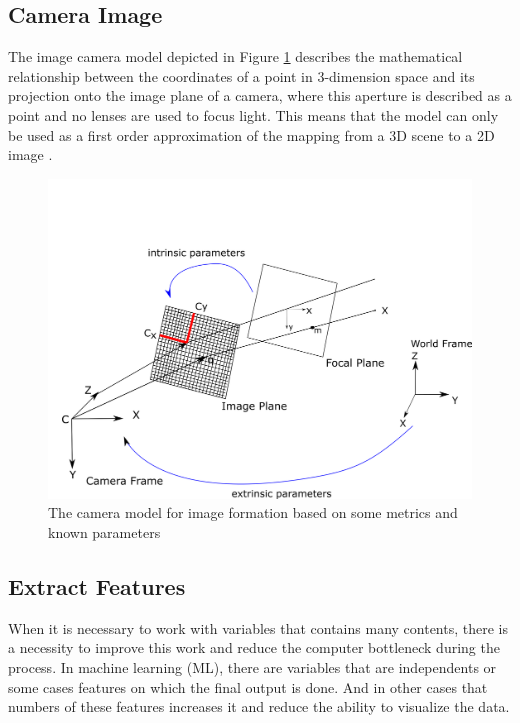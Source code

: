 \subsection{Camera Image}

The image camera model depicted in Figure \ref{fig:image_formation} describes the mathematical relationship between the coordinates of a point in 3-dimension space and its projection onto
the image plane of a camera, where this aperture is described as a point and no lenses are used to focus light. This means that the model can only be used as a first order approximation of the mapping from a 3D scene to a 2D image \cite{forsyth2002computer}.




\begin{figure}[H]
\centering
\includegraphics[width=\textwidth]{imagens/image_formation.png}
\caption{The camera model for image formation based on some metrics and known parameters}
\label{fig:image_formation}
\end{figure}

\subsection{Extract Features}

When it is necessary to work with variables that contains many contents, there is a necessity to improve this work and reduce the computer bottleneck during the process. In machine learning (ML), there are variables that are independents or some cases features on which the final output is done. And in other cases that numbers of these features increases it and reduce the ability to visualize the data. 

